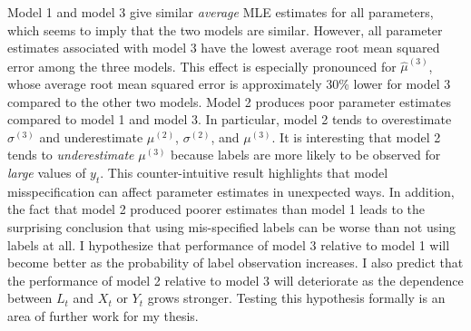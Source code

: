 %
Model 1 and model 3 give similar \textit{average} MLE estimates for all parameters, which seems to imply that the two models are similar. However, all parameter estimates associated with model 3 have the lowest average root mean squared error among the three models. This effect is especially pronounced for $\hat \mu^{(3)}$, whose average root mean squared error is approximately 30\% lower for model 3 compared to the other two models. 
Model 2 produces poor parameter estimates compared to model 1 and model 3. In particular, model 2 tends to overestimate $\sigma^{(3)}$ and underestimate $\mu^{(2)}$, $\sigma^{(2)}$, and $\mu^{(3)}$. It is interesting that model 2 tends to \textit{underestimate} $\mu^{(3)}$ because labels are more likely to be observed for \textit{large} values of $y_t$. This counter-intuitive result highlights that model misspecification can affect parameter estimates in unexpected ways. In addition, the fact that model 2 produced poorer estimates than model 1 leads to the surprising conclusion that using mis-specified labels can be worse than not using labels at all. I hypothesize that performance of model 3 relative to model 1 will become better as the probability of label observation increases. I also predict that the performance of model 2 relative to model 3 will deteriorate as the dependence between $L_t$ and $X_t$ or $Y_t$ grows stronger. Testing this hypothesis formally is an area of further work for my thesis.